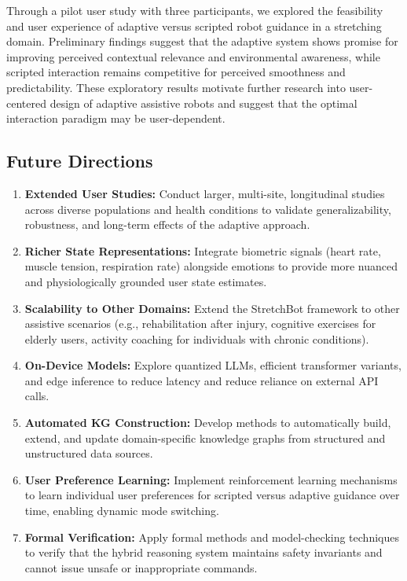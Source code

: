 \documentclass[pdflatex,sn-basic,Numbered,iicol,twocolumn]{sn-jnl}%
\begin{document}
Through a pilot user study with three participants, we explored the feasibility and user experience of adaptive versus scripted robot guidance in a stretching domain. Preliminary findings suggest that the adaptive system shows promise for improving perceived contextual relevance and environmental awareness, while scripted interaction remains competitive for perceived smoothness and predictability. These exploratory results motivate further research into user-centered design of adaptive assistive robots and suggest that the optimal interaction paradigm may be user-dependent.

\subsection{Future Directions}

\begin{enumerate}
\item \textbf{Extended User Studies:} Conduct larger, multi-site, longitudinal studies across diverse populations and health conditions to validate generalizability, robustness, and long-term effects of the adaptive approach.

\item \textbf{Richer State Representations:} Integrate biometric signals (heart rate, muscle tension, respiration rate) alongside emotions to provide more nuanced and physiologically grounded user state estimates.

\item \textbf{Scalability to Other Domains:} Extend the StretchBot framework to other assistive scenarios (e.g., rehabilitation after injury, cognitive exercises for elderly users, activity coaching for individuals with chronic conditions).

\item \textbf{On-Device Models:} Explore quantized LLMs, efficient transformer variants, and edge inference to reduce latency and reduce reliance on external API calls.

\item \textbf{Automated KG Construction:} Develop methods to automatically build, extend, and update domain-specific knowledge graphs from structured and unstructured data sources.

\item \textbf{User Preference Learning:} Implement reinforcement learning mechanisms to learn individual user preferences for scripted versus adaptive guidance over time, enabling dynamic mode switching.

\item \textbf{Formal Verification:} Apply formal methods and model-checking techniques to verify that the hybrid reasoning system maintains safety invariants and cannot issue unsafe or inappropriate commands.
\end{enumerate}
\end{document}
